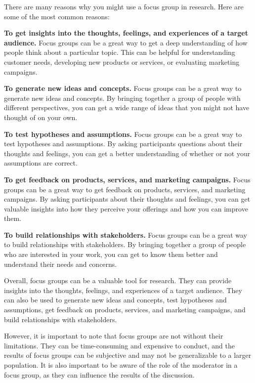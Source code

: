 \documentclass[
  b5paper]{book}
\begin{document}
There are many reasons why you might use a focus group in research. Here are some of the most common reasons:

\textbf{To get insights into the thoughts, feelings, and experiences of a target audience.} Focus groups can be a great way to get a deep understanding of how people think about a particular topic. This can be helpful for understanding customer needs, developing new products or services, or evaluating marketing campaigns.

\textbf{To generate new ideas and concepts.} Focus groups can be a great way to generate new ideas and concepts. By bringing together a group of people with different perspectives, you can get a wide range of ideas that you might not have thought of on your own.

\textbf{To test hypotheses and assumptions.} Focus groups can be a great way to test hypotheses and assumptions. By asking participants questions about their thoughts and feelings, you can get a better understanding of whether or not your assumptions are correct.

\textbf{To get feedback on products, services, and marketing campaigns.} Focus groups can be a great way to get feedback on products, services, and marketing campaigns. By asking participants about their thoughts and feelings, you can get valuable insights into how they perceive your offerings and how you can improve them.

\textbf{To build relationships with stakeholders.} Focus groups can be a great way to build relationships with stakeholders. By bringing together a group of people who are interested in your work, you can get to know them better and understand their needs and concerns.

Overall, focus groups can be a valuable tool for research. They can provide insights into the thoughts, feelings, and experiences of a target audience. They can also be used to generate new ideas and concepts, test hypotheses and assumptions, get feedback on products, services, and marketing campaigns, and build relationships with stakeholders.

However, it is important to note that focus groups are not without their limitations. They can be time-consuming and expensive to conduct, and the results of focus groups can be subjective and may not be generalizable to a larger population. It is also important to be aware of the role of the moderator in a focus group, as they can influence the results of the discussion.
\end{document}
